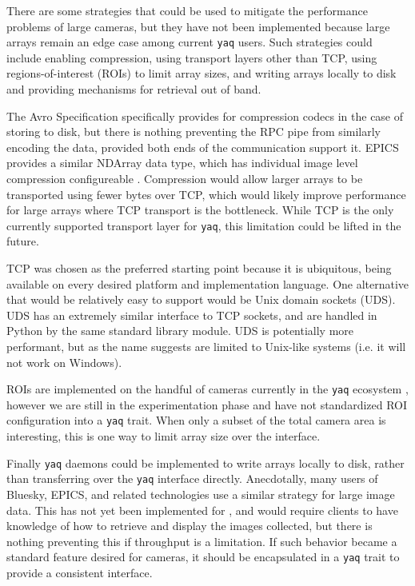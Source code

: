 \documentclass[11pt, full]{article}
\newcommand\yaq{\texttt{yaq}}
\begin{document}
There are some strategies that could be used to mitigate the performance problems of large cameras, but they have not been implemented because large arrays remain an edge case among current \yaq{} users.
Such strategies could include enabling compression, using transport layers other than TCP, using regions-of-interest (ROIs) to limit array sizes, and writing arrays locally to disk and providing mechanisms for retrieval out of band.

The Avro Specification \cite{AvroSpecification} specifically provides for compression codecs in the case of storing to disk, but there is nothing preventing the RPC pipe from similarly encoding the data, provided both ends of the communication support it.
EPICS provides a similar NDArray data type, which has individual image level compression configureable \cite{normative_types}.
Compression would allow larger arrays to be transported using fewer bytes over TCP, which would likely improve performance for large arrays where TCP transport is the bottleneck.
While TCP is the only currently supported transport layer for \yaq{}, this limitation could be lifted in the future.

TCP was chosen as the preferred starting point because it is ubiquitous, being available on every desired platform and implementation language.
One alternative that would be relatively easy to support would be Unix domain sockets (UDS).
UDS has an extremely similar interface to TCP sockets, and are handled in Python by the same standard library module.
UDS is potentially more performant, but as the name suggests are limited to Unix-like systems (i.e. it will not work on Windows).

ROIs are implemented on the handful of cameras currently in the \yaq{} ecosystem \cite{yaqd_andor,yaqd_pi}, however we are still in the experimentation phase and have not standardized ROI configuration into a \yaq{} trait.
When only a subset of the total camera area is interesting, this is one way to limit array size over the interface.

Finally \yaq{} daemons could be implemented to write arrays locally to disk, rather than transferring over the \yaq{} interface directly.
Anecdotally, many users of Bluesky, EPICS, and related technologies use a similar strategy for large image data.
This has not yet been implemented for \ya{}, and would require clients to have knowledge of how to retrieve and display the images collected, but there is nothing preventing this if throughput is a limitation.
If such behavior became a standard feature desired for cameras, it should be encapsulated in a \yaq{} trait to provide a consistent interface.
\end{document}
